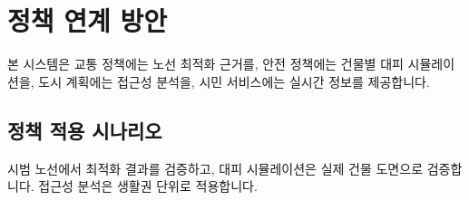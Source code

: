 \section{정책 연계 방안}

본 시스템은 교통 정책에는 노선 최적화 근거를, 안전 정책에는 건물별 대피 시뮬레이션을, 도시 계획에는 접근성 분석을, 시민 서비스에는 실시간 정보를 제공합니다.

\subsection{정책 적용 시나리오}
시범 노선에서 최적화 결과를 검증하고, 대피 시뮬레이션은 실제 건물 도면으로 검증합니다. 접근성 분석은 생활권 단위로 적용합니다.

